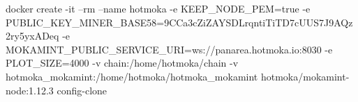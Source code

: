 \begin{shellcommandbox}\begin{ttlst}
docker create -it --rm --name hotmoka -e KEEP_NODE_PEM=true -e PUBLIC_KEY_MINER_BASE58=9CCa3cZiZAYSDLrqntiTiTD7cUUS7J9AQz2ry5yxADeq -e MOKAMINT_PUBLIC_SERVICE_URI=ws://panarea.hotmoka.io:8030 -e PLOT_SIZE=4000 -v chain:/home/hotmoka/chain -v hotmoka_mokamint:/home/hotmoka/hotmoka_mokamint hotmoka/mokamint-node:1.12.3 config-clone
\end{ttlst}\end{shellcommandbox}
